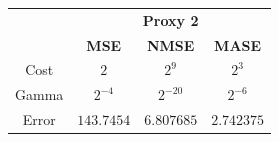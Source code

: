 \begin{center}
\begin{tabular}{|c|c|c|c|}
\hline
& \multicolumn{3}{|c|}{\textbf{Proxy 2}} \\ \cline{2-4}
& \textbf{MSE} & \textbf{NMSE} & \textbf{MASE}          \\ \hline
Cost  & $2$            &$2^9$& $2^3$          \\ 
Gamma & $2^{-4}$ &$2^{-20}$& $2^{-6}$ \\ 
Error & $143.7454$ &$6.807685$& $2.742375$     \\ 
\hline
\end{tabular}


 \begin{figure}[!h]
\centering
{}
\end{figure}
\end{center}
